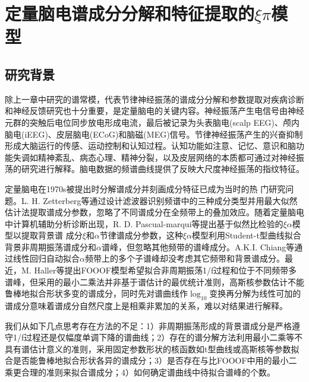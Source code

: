 \chapter{定量脑电谱成分分解和特征提取的\texorpdfstring{$\xi\pi$}{ξπ}模型}
\section{研究背景}
除上一章中研究的谱常模，代表节律神经振荡的谱成分分解和参数提取对疾病诊断和神经反馈研究也十分重要，是定量脑电的关键内容。神经振荡产生电信号由神经元群的突触后电位同步放电形成电流，最后被记录为头表脑电(scalp EEG)、颅内脑电(iEEG)、皮层脑电(ECoG)和脑磁(MEG)信号。节律神经振荡产生的兴奋抑制形成大脑运行的传感、运动控制和认知过程。认知功能如注意、记忆、意识和脑功能失调如精神紊乱、病态心理、精神分裂，以及皮层网络的本质都可通过对神经振荡的研究进行解释。脑电数据的频谱曲线提供了反映大尺度神经振荡的指纹特征。

定量脑电在1970s被提出时分解谱成分并刻画成分特征已成为当时的热
门研究问题。L. H. Zetterberg等通过设计滤波器识别频谱中的三种成分类型并用最大似然估计法提取谱成分参数，忽略了不同谱成分在全频带上的叠加效应。随着定量脑电中计算机辅助分析诊断出现，R. D. Pascual-marqui等提出基于似然比检验的$\xi\alpha$模型以提取背景谱
成分$\xi$和$\alpha$节律谱成分参数，这种$\xi\alpha$模型利用Student-t型曲线拟合背景非周期振荡谱成分和$\alpha$谱峰，但忽略其他频带的谱峰成分。A.K.I. Chiang等通过线性回归自动拟合$\alpha$频带上的多个子谱峰却没考虑其它频带和背景谱成分。最近，M. Haller等提出FOOOF模型希望拟合非周期振荡1/f过程和位于不同频带多谱峰，但采用的最小二乘法并非基于谱估计的最优统计准则，高斯核参数估计不能鲁棒地拟合形状多变的谱成分，同时先对谱曲线作$\log_{10}$变换再分解为线性可加的谱成分意味着谱成分自然尺度上是相乘非累加的关系，难以对结果进行解释。

我们从如下几点思考存在方法的不足：1）非周期振荡形成的背景谱成分是严格遵守1/f过程还是仅幅度单调下降的谱曲线；2）存在的谱分解方法利用最小二乘等不具有谱估计意义的准则，采用固定参数形状的核函数如t型曲线或高斯核等参数拟合是否能鲁棒地拟合形状各异的谱成分；3）是否存在与比FOOOF中用的最小二乘更合理的准则来拟合谱成分；4）如何确定谱曲线中待拟合谱峰的个数。

